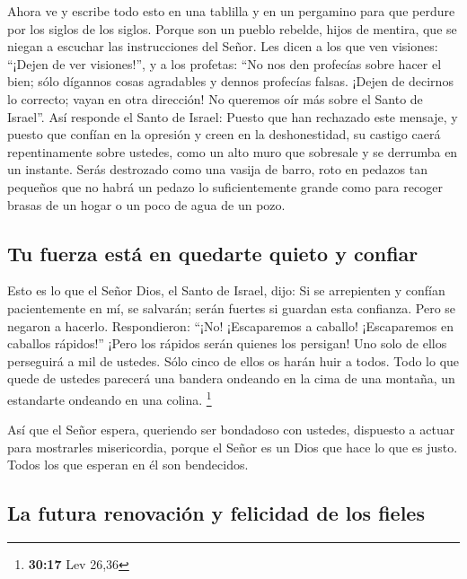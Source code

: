  Ahora ve y escribe todo esto en una tablilla y en un
pergamino para que perdure por los siglos de los siglos. 
Porque son un pueblo rebelde, hijos de mentira, que se niegan a escuchar
las instrucciones del Señor.  Les dicen a los que ven
visiones: ``¡Dejen de ver visiones!'', y a los profetas: ``No nos den
profecías sobre hacer el bien; sólo dígannos cosas agradables y dennos
profecías falsas.  ¡Dejen de decirnos lo correcto; vayan
en otra dirección! No queremos oír más sobre el Santo de Israel''.
 Así responde el Santo de Israel: Puesto que han
rechazado este mensaje, y puesto que confían en la opresión y creen en
la deshonestidad,  su castigo caerá repentinamente sobre
ustedes, como un alto muro que sobresale y se derrumba en un instante.
 Serás destrozado como una vasija de barro, roto en
pedazos tan pequeños que no habrá un pedazo lo suficientemente grande
como para recoger brasas de un hogar o un poco de agua de un pozo.

\hypertarget{tu-fuerza-estuxe1-en-quedarte-quieto-y-confiar}{%
\subsection{Tu fuerza está en quedarte quieto y
confiar}\label{tu-fuerza-estuxe1-en-quedarte-quieto-y-confiar}}

 Esto es lo que el Señor Dios, el Santo de Israel, dijo:
Si se arrepienten y confían pacientemente en mí, se salvarán; serán
fuertes si guardan esta confianza. Pero se negaron a hacerlo.
 Respondieron: ``¡No! ¡Escaparemos a caballo!
¡Escaparemos en caballos rápidos!'' ¡Pero los rápidos serán quienes los
persigan!  Uno solo de ellos perseguirá a mil de ustedes.
Sólo cinco de ellos os harán huir a todos. Todo lo que quede de ustedes
parecerá una bandera ondeando en la cima de una montaña, un estandarte
ondeando en una colina. \footnote{\textbf{30:17} Lev 26,36}

 Así que el Señor espera, queriendo ser bondadoso con
ustedes, dispuesto a actuar para mostrarles misericordia, porque el
Señor es un Dios que hace lo que es justo. Todos los que esperan en él
son bendecidos.

\hypertarget{la-futura-renovaciuxf3n-y-felicidad-de-los-fieles}{%
\subsection{La futura renovación y felicidad de los
fieles}\label{la-futura-renovaciuxf3n-y-felicidad-de-los-fieles}}

